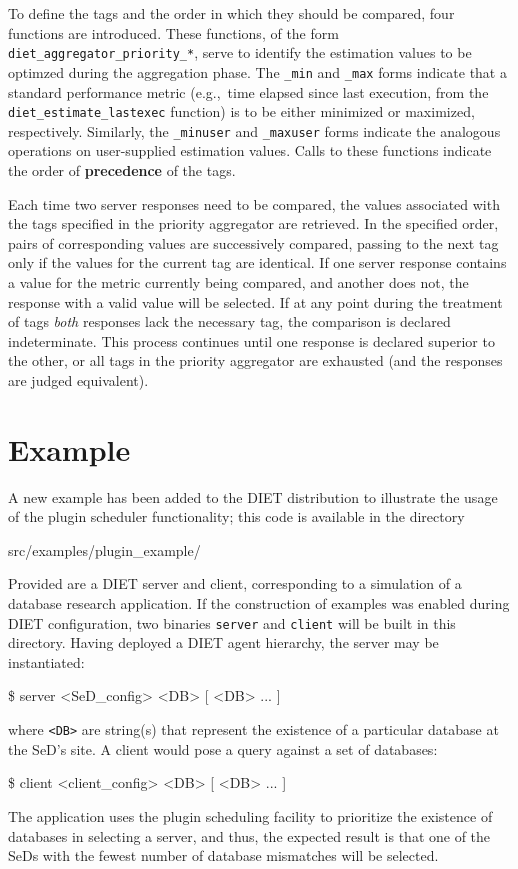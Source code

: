 To define the tags and the order in which they should be compared,
four functions are introduced.  These functions, of the form
\texttt{diet\_aggregator\_priority\_*}, serve to identify the
estimation values to be optimzed during the aggregation phase.  The
\texttt{\_min} and \texttt{\_max} forms indicate that a standard
performance metric (e.g.,~time elapsed since last execution, from the
\texttt{diet\_estimate\_lastexec} function) is to be either
minimized or maximized, respectively.  Similarly, the
\texttt{\_minuser} and \texttt{\_maxuser} forms indicate the analogous
operations on user-supplied estimation values.  Calls to these
functions indicate the order of \textbf{precedence} of the tags.

Each time two server responses need to be compared, the values
associated with the tags specified in the priority aggregator are
retrieved.  In the specified order, pairs of corresponding values are
successively compared, passing to the next tag only if the values for
the current tag are identical.  If one server response contains a
value for the metric currently being compared, and another does not,
the response with a valid value will be selected.  If at any point
during the treatment of tags \emph{both} responses lack the necessary
tag, the comparison is declared indeterminate.
This process continues until one response is
declared superior to the other, or all tags in the priority aggregator
are exhausted (and the responses are judged equivalent).


\section{Example}

A new example has been added to the DIET distribution to illustrate
the usage of the plugin scheduler functionality; this code is
available in the directory
\begin{code}
src/examples/plugin\_example/
\end{code}
Provided are a DIET server and client, corresponding to a simulation
of a database research application.  If the construction of examples
was enabled during DIET configuration, two binaries \texttt{server}
and \texttt{client} will be built in this directory.  Having deployed
a DIET agent hierarchy, the server may be instantiated:
\begin{code}
  \$ server <SeD\_config> <DB> [ <DB> ... ]
\end{code}
where \texttt{<DB>} are string(s) that represent the existence of
a particular database at the SeD's site.  A client would pose a query
against a set of databases:
\begin{code}
  \$ client <client\_config> <DB> [ <DB> ... ]
\end{code}
The application uses the plugin scheduling facility to prioritize the
existence of databases in selecting a server, and thus, the expected
result is that one of the SeDs with the fewest number of database
mismatches will be selected.

